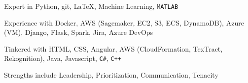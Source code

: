 

\begin{cvskills}

  \cvskill
    {Expert in} %
    {Python, git, \LaTeX, Machine Learning, {\texttt{MATLAB}}} %

  \cvskill
    {Experience with} %
    {Docker, AWS (Sagemaker, EC2, S3, ECS, DynamoDB), Azure (VM), Django, Flask, Spark,
      Jira, Azure DevOps} %

  \cvskill
    {Tinkered with} %
    {HTML, CSS, Angular, AWS (CloudFormation, TexTract, Rekognition), Java, Javascript,
      {\texttt{C\#}}, {\texttt{C++}}} %

  \cvskill
    {Strengths include} %
    {Leadership, Prioritization, Communication, Tenacity} %

\end{cvskills}
